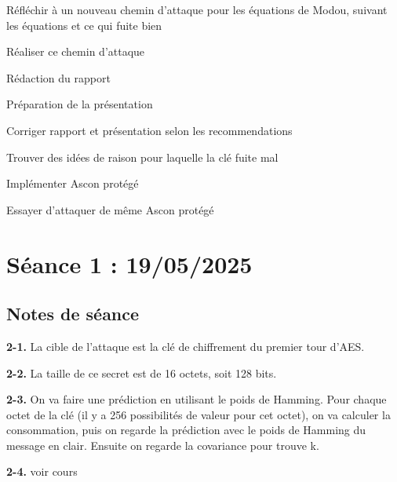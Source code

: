\documentclass[12pt]{article}
\newcommand{\cmark}{\ding{51}}%
\newcommand{\xmark}{\ding{55}}%
\newcommand{\done}{\rlap{$\square$}{\raisebox{2pt}{\large\hspace{1pt}\cmark}}%
	\hspace{-2.5pt}}
\newcommand{\wontfix}{\rlap{$\square$}{\large\hspace{1pt}\xmark}}
\begin{document}
\begin{todolist}
		\item[\done] Réfléchir à un nouveau chemin d'attaque pour les équations de Modou, suivant les équations et ce qui fuite bien
		\item[\done] Réaliser ce chemin d'attaque
		\item[\done] Rédaction du rapport
		\item[\done] Préparation de la présentation
		\item Corriger rapport et présentation selon les recommendations
		\item[\done] Trouver des idées de raison pour laquelle la clé fuite mal
		\item Implémenter Ascon protégé
		\item[\wontfix] Essayer d'attaquer de même Ascon protégé
	\end{todolist}
	\section{Séance 1 : 19/05/2025}
	\subsection{Notes de séance}
	
	\textbf{2-1.} La cible de l'attaque est la clé de chiffrement du premier tour d'AES.
	
	\noindent \textbf{2-2.} La taille de ce secret est de 16 octets, soit 128 bits.
	
	\noindent \textbf{2-3.} On va faire une prédiction en utilisant le poids de Hamming. Pour chaque octet de la clé (il y a 256 possibilités de valeur pour cet octet), on va calculer la consommation, puis on regarde la prédiction avec le poids de Hamming du message en clair. Ensuite on regarde la covariance pour trouve k.
	
	\noindent \textbf{2-4.} voir cours
	
\end{document}
